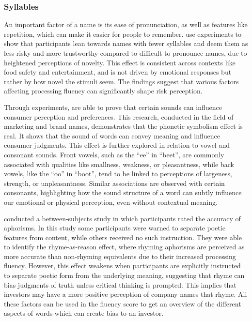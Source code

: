 \documentclass[a4paper,11pt]{report}
\begin{document}
\subsubsection{Syllables}
An important factor of a name is its ease of pronunciation, as well as features like repetition, which can make it easier for people to remember.  use experiments to show that participants lean towards names with fewer syllables and deem them as less risky and more trustworthy compared to difficult-to-pronounce names, due to heightened perceptions of novelty. This effect is consistent across contexts like food safety and entertainment, and is not driven by emotional responses but rather by how novel the stimuli seem. The findings suggest that various factors affecting processing fluency can significantly shape risk perception. 

Through experiments,  are able to prove that certain sounds can influence consumer perception and preferences. This research, conducted in the field of marketing and brand names, demonstrates that the phonetic symbolism effect is real. It shows that the sound of words can convey meaning and influence consumer judgments. This effect is further explored in relation to vowel and consonant sounds. Front vowels, such as the ``ee'' in ``beet'', are commonly associated with qualities like smallness, weakness, or pleasantness, while back vowels, like the ``oo'' in ``boot'', tend to be linked to perceptions of largeness, strength, or unpleasantness. Similar associations are observed with certain consonants, highlighting how the sound structure of a word can subtly influence our emotional or physical perception, even without contextual meaning.

 conducted a between-subjects study in which participants rated the accuracy of aphorisms. In this study some participants were warned to separate poetic features from content, while others received no such instruction. They were able to identify the rhyme-as-reason effect, where rhyming aphorisms are perceived as more accurate than non-rhyming equivalents due to their increased processing fluency. However, this effect weakens when participants are explicitly instructed to separate poetic form from the underlying meaning, suggesting that rhyme can bias judgments of truth unless critical thinking is prompted. This implies that investors may have a more positive perception of company names that rhyme. All these factors can be used in the fluency score to get an overview of the different aspects of words which can create bias to an investor. 
\end{document}
